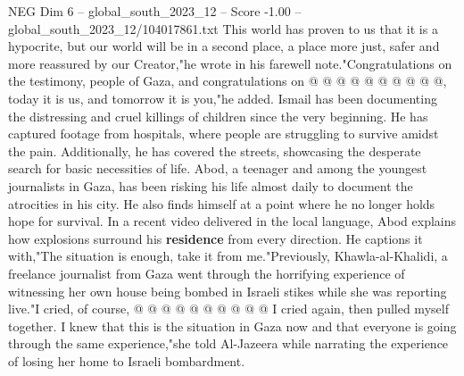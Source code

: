 \begin{textsample}{NEG Dim 6 – global\_south\_2023\_12 – Score -1.00 – global\_south\_2023\_12/104017861.txt}
This world has proven to us that it is a hypocrite, but our world will be in a second place, a place more just, safer and more reassured by our Creator,"he wrote in his farewell note."Congratulations on the testimony, people of Gaza, and congratulations on @ @ @ @ @ @ @ @ @ @, today it is us, and tomorrow it is you,"he added.
Ismail has been documenting the distressing and cruel killings of children since the very beginning.
He has captured footage from hospitals, where people are struggling to survive amidst the pain.
Additionally, he has covered the streets, showcasing the desperate search for basic necessities of life.
Abod, a teenager and among the youngest journalists in Gaza, has been risking his life almost daily to document the atrocities in his city.
He also finds himself at a point where he no longer holds hope for survival.
In a recent video delivered in the local language, Abod explains how explosions surround his \textbf{residence} from every direction.
He captions it with,"The situation is enough, take it from me."Previously, Khawla-al-Khalidi, a freelance journalist from Gaza went through the horrifying experience of witnessing her own house being bombed in Israeli stikes while she was reporting live."I cried, of course, @ @ @ @ @ @ @ @ @ @ I cried again, then pulled myself together.
I knew that this is the situation in Gaza now and that everyone is going through the same experience,"she told Al-Jazeera while narrating the experience of losing her home to Israeli bombardment.

\end{textsample}
